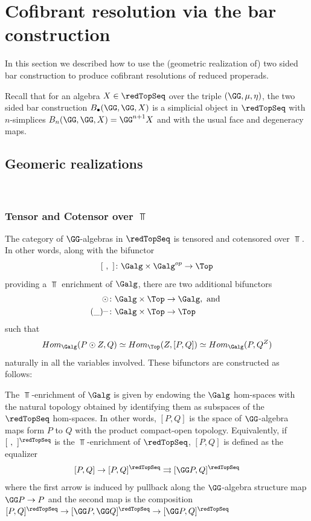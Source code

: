 \documentclass[a4paper,10pt]{amsart}
\begin{document}
\section{Cofibrant resolution via the bar construction}\label{bar_const_red_sec}
In this section we described how to use the (geometric realization of) two sided bar construction to produce cofibrant resolutions of reduced properads. 

Recall that for an algebra $X \in \redTopSeq$ over the triple $(\GG,\mu,\eta)$, the two sided bar construction $B_\bullet(\GG,\GG,X)$ is a simplicial object in $\redTopSeq$ with $n$-simplices $B_n(\GG,\GG,X) = \GG^{n+1}X$ and with the usual face and degeneracy maps.

\subsection{Geomeric realizations}	\ \\
\subsubsection{Tensor and Cotensor over $\Top$}
The category of $\GG$-algebras in $\redTopSeq$ is tensored and cotensored over $\Top$. In other words, along with the bifunctor 
\[  [\ ,\ ] \colon \Galg \times \Galg^{op} \to \Top \]
providing a $\Top$ enrichment of $\Galg$, there are two additional bifunctors 
\begin{align*}
\odot &\colon \Galg \times \Top \to \Galg, \mbox{  and }\\ 
(\_)^{\_} &\colon \Galg \times \Top \to \Top  
\end{align*}
such that 
\[ Hom_{\Galg}(P \odot Z, Q) \simeq Hom_{\Top} ( Z, [P,Q]) \simeq Hom_{\Galg}(P,Q^Z) \]
naturally in all the variables involved. These bifunctors are constructed as follows:

The $\Top$-enrichment of $\Galg$ is given by endowing the $\Galg$ hom-spaces with the natural topology obtained by identifying them as subspaces of the $\redTopSeq$ hom-spaces. In other words, $[P,Q]$ is the space of $\GG$-algebra maps form $P$ to $Q$ with the product compact-open topology. Equivalently, if $[\ ,\ ]^{\redTopSeq}$ is the $\Top$-enrichment of $\redTopSeq$, $[ P,Q ]$ is defined as the equalizer
\[ [ P ,Q ]  \to [ P , Q ]^{\redTopSeq} \rightrightarrows [\GG P , Q ]^{\redTopSeq} \]
where the first arrow is induced by pullback along the $\GG$-algebra structure map $\GG P \to P$ and the second map is the composition $[P,Q]^{\redTopSeq} \to [\GG P, \GG Q]^{\redTopSeq} \to  [\GG P, Q]^{\redTopSeq}$
\end{document}
